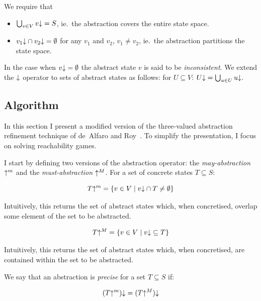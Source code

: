 We require that 
\begin{itemize}
    \item $\bigcup_{v\in V}v\mathord{\downarrow} = S$, ie.\ the abstraction covers the entire state space. 
    \item $v_1\mathord{\downarrow}\cap v_2\mathord{\downarrow} = \emptyset$ for any $v_1$ and $v_2$, $v_1 \neq v_2$, ie.\ the abstraction partitions the state space.
\end{itemize}

In the case when $v\mathord{\downarrow} = \emptyset$ the abstract state $v$ is said to be \emph{inconsistent}. We extend the $\mathord{\downarrow}$ operator to sets of abstract states as follows: for $U\subseteq V$: $U\mathord{\downarrow} = \bigcup_{u\in U}u\mathord{\downarrow}$.

\subsection{Algorithm}
\label{sec:threeval_generic}

In this section I present a modified version of the three-valued abstraction refinement technique of de~Alfaro and Roy~\cite{Alfaro_Roy_07}. To simplify the presentation, I focus on solving reachability games. 

I start by defining two versions of the abstraction operator: the \emph{may-abstraction} $\mathord{\uparrow^m}$ and the \emph{must-abstraction} $\mathord{\uparrow^M}$. For a set of concrete states $T \subseteq S$:

\begin{equation}
T\mathord{\uparrow^m} = \{v\in V\mid v\mathord{\downarrow} \cap T \neq \emptyset\} 
\end{equation}

Intuitively, this returns the set of abstract states which, when concretised, overlap some element of the set to be abstracted.

\begin{equation}
T\mathord{\uparrow^M} = \{v\in V\mid v\mathord{\downarrow} \subseteq T \}
\end{equation}

Intuitively, this returns the set of abstract states which, when concretised, are contained within the set to be abstracted.

We say that an abstraction is \emph{precise} for a set $T\subseteq S$ if:

\begin{equation}
(T\mathord{\uparrow^m})\mathord{\downarrow} = (T\mathord{\uparrow^M})\mathord{\downarrow}
\end{equation}

